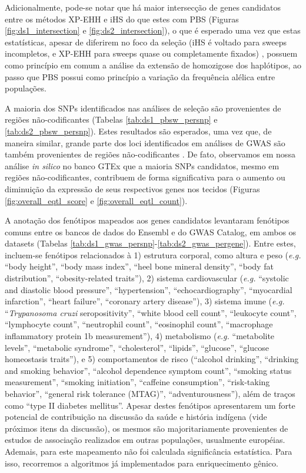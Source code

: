 Adicionalmente, pode-se notar que há maior intersecção de genes candidatos entre os métodos XP-EHH e iHS do que estes com PBS (Figuras \ref{fig:ds1_intersection} e \ref{fig:ds2_intersection}), o que é esperado uma vez que estas estatísticas, apesar de diferirem no foco da seleção (iHS é voltado para sweeps incompletos, e XP-EHH para sweeps quase ou completamente fixados) \cite{suzuki_statistical_2010}, possuem como princípio em comum a análise da extensão de homozigose dos haplótipos, ao passo que PBS possui como princípio a variação da frequência alélica entre populações.

A maioria dos SNPs identificados nas análises de seleção são provenientes de regiões não-codificantes (Tabelas \ref{tab:ds1_pbsw_persnp} e \ref{tab:ds2_pbsw_persnp}). Estes resultados são esperados, uma vez que, de maneira similar, grande parte dos loci identificados em análises de GWAS são também provenientes de regiões não-codificantes \cite{croteau-chonka_expression_2015,hill_genome-wide_2019}. De fato, observamos em nossa análise \textit{in silico} no banco GTEx que a maioria SNPs candidatos, mesmo em regiões não-codificantes, contribuem de forma significativa para o aumento ou diminuição da expressão de seus respectivos genes nos tecidos (Figuras \ref{fig:overall_eqtl_score} e \ref{fig:overall_eqtl_count}). 

A anotação dos fenótipos mapeados aos genes candidatos levantaram fenótipos comuns entre os bancos de dados do Ensembl e do GWAS Catalog, em ambos os datasets (Tabelas \ref{tab:ds1_gwas_persnp}-\ref{tab:ds2_gwas_pergene}). Entre estes, incluem-se fenótipos relacionados à 1) estrutura corporal, como altura e peso (\emph{e.g.} “body height”, “body mass index”, “heel bone mineral density”, “body fat distribution”, “obesity-related traits”), 2) sistema cardiovascular (\emph{e.g.} “systolic and diastolic blood pressure”, “hypertension”, “echocardiography”, “myocardial infarction”, “heart failure”, “coronary artery disease”), 3) sistema imune (\emph{e.g.} “\textit{Trypanosoma cruzi} seropositivity”, “white blood cell count”, “leukocyte count”, “lymphocyte count”, “neutrophil count”, “eosinophil count”, “macrophage inflammatory protein 1b measurement”), 4) metabolismo (\emph{e.g.} “metabolite levels”, “metabolic syndrome”, “cholesterol”, “lipids”, “glucose”, “glucose homeostasis traits”), e 5) comportamentos de risco (“alcohol drinking”, “drinking and smoking behavior”, “alcohol dependence symptom count”, “smoking status measurement”, “smoking initiation”, “caffeine consumption”, “risk-taking behavior”, “general risk tolerance (MTAG)”, “adventurousness”), além de traços como “type II diabetes mellitus”. Apesar destes fenótipos apresentarem um forte potencial de contribuição na discussão da saúde e história indígena (vide próximos itens da discussão), os mesmos são majoritariamente provenientes de estudos de associação realizados em outras populações, usualmente européias. Ademais, para este mapeamento não foi calculada significância estatística. Para isso, recorremos a algoritmos já implementados para enriquecimento gênico.

